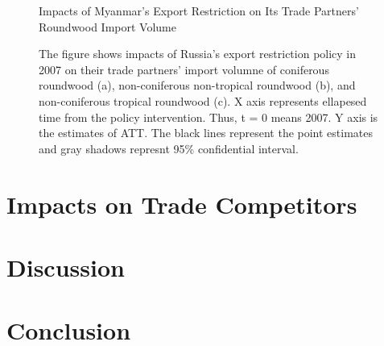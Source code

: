 \documentclass[a4paper,12pt]{article}
\begin{document}
\begin{figure}[H] 
    \centering
    \caption{Impacts of Myanmar's Export Restriction on Its Trade Partners' Roundwood Import Volume}
    \caption*{\small{The figure shows impacts of Russia's export restriction policy in 2007 on their trade partners' import volumne of coniferous roundwood (a), non-coniferous non-tropical roundwood (b), and non-coniferous tropical roundwood (c). X axis represents ellapesed time from the policy intervention. Thus, t = 0 means 2007. Y axis is the estimates of ATT. The black lines represent the point estimates and gray shadows represnt 95\% confidential interval.}}
    \label{fig:cf_imp_Myanmar}
\end{figure}

\section{Impacts on Trade Competitors}

\section{Discussion}

\section{Conclusion}


\end{document}

